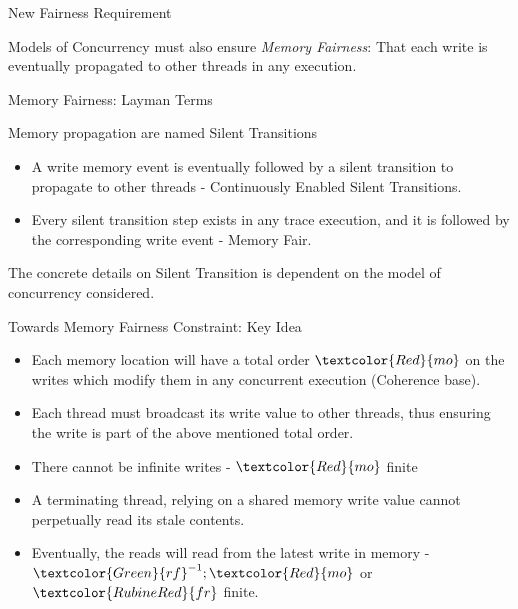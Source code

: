 \documentclass[dvipsnames, notes]{beamer}
\newcommand{\rf}{\textcolor{Green}{rf}}
\newcommand{\fr}{\textcolor{RubineRed}{fr}}
\newcommand{\mo}{\textcolor{Red}{mo}}
\begin{document}
    \begin{frame}{New Fairness Requirement}
      
      \begin{center}
        Models of Concurrency must also ensure \emph{Memory Fairness}: That each write is eventually propagated to other threads in any execution. 
      \end{center}

    \end{frame}

    \begin{frame}{Memory Fairness: Layman Terms}
      
      Memory propagation are named Silent Transitions  
      \begin{itemize}
        \item A write memory event is eventually followed by a silent transition to propagate to other threads - Continuously Enabled Silent Transitions.
        \item Every silent transition step exists in any trace execution, and it is followed by the corresponding write event - Memory Fair. 
      \end{itemize}
      
      \begin{center}
        The concrete details on Silent Transition is dependent on the model of concurrency considered.   
      \end{center}
      
    \end{frame}

    \begin{frame}{Towards Memory Fairness Constraint: Key Idea}

      \begin{itemize}
        \item Each memory location will have a total order $\mo$ on the writes which modify them in any concurrent execution (Coherence base).
        \item Each thread must broadcast its write value to other threads, thus ensuring the write is part of the above mentioned total order.
        \item There cannot be infinite writes - $\mo$ finite 
        \item A terminating thread, relying on a shared memory write value cannot perpetually read its stale contents.
        \item Eventually, the reads will read from the latest write in memory - $\rf^{-1};\mo$ or $\fr$ finite.  
      \end{itemize}
  
    \end{frame}
\end{document}
